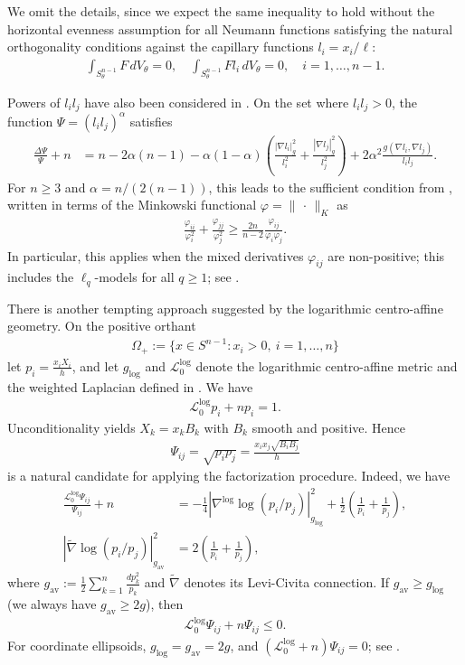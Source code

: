 \documentclass[12pt]{amsart}
\newcommand{\Sn}{S^{n-1}}
\newcommand{\abs}[1]{\left|#1\right|}
\newcommand{\eq}[1]{\begin{equation}\begin{alignedat}{2}#1\end{alignedat}\end{equation}}
\theoremstyle{plain}
\theoremstyle{definition}
\theoremstyle{remark}
\numberwithin{equation}{section}
\begin{document}
We omit the details, since we expect the same inequality to hold without the horizontal evenness assumption for all Neumann functions satisfying the natural orthogonality conditions against the capillary functions $l_i=x_i/\ell$:
\eq{
 \int_{\Sn_{\theta}}F\,dV_{\theta}=0,
 \quad
 \int_{\Sn_{\theta}}Fl_i\,dV_{\theta}=0, \quad i=1,\ldots,n-1.
}

Powers of $l_il_j$ have also been considered in \cite{KLR25}. On the set where $l_il_j>0$, the function $\Psi=(l_il_j)^{\alpha}$ satisfies
\eq{\label{eq:intro-power-supersolution}
\frac{\Delta\Psi}{\Psi}+n
&=n-2\alpha(n-1)-\alpha(1-\alpha)\left(\frac{\abs{\nabla l_i}_g^2}{l_i^2}
+\frac{\abs{\nabla l_j}_g^2}{l_j^2}\right)+2\alpha^2\frac{g(\nabla l_i,\nabla l_j)}{l_il_j}.
}
For $n\ge 3$ and $\alpha=n/(2(n-1))$, this leads to the sufficient condition from \cite[Thm. 1.9]{KLR25}, written in terms of the Minkowski functional $\varphi=\|\,\cdot\,\|_K$ as
\eq{
 \frac{\varphi_{ii}}{\varphi_i^2}+\frac{\varphi_{jj}}{\varphi_j^2}
 \ge \frac{2n}{n-2}\frac{\varphi_{ij}}{\varphi_i\varphi_j}.
}
In particular, this applies when the mixed derivatives $\varphi_{ij}$ are non-positive; this includes the $\ell_q$-models for all $q\geq 1$; see \cite[Cor. 1.6]{KLR25}.

There is another tempting approach suggested by the logarithmic centro-affine geometry. On the positive orthant
\eq{
 \Omega_+:=\{x\in\Sn:x_i>0,\ i=1,\ldots,n\}
}
let $p_i=\frac{x_iX_i}{h}$, and let $g_{\log}$ and $\mathcal{L}_0^{\log}$ denote the logarithmic centro-affine metric and the weighted Laplacian defined in \cite[Sec. 8]{HI26}. We have
\eq{
\mathcal{L}_0^{\log}p_i+np_i=1.
}
Unconditionality yields $X_k=x_kB_k$ with $B_k$ smooth and positive. Hence
\eq{
 \Psi_{ij}=\sqrt{p_ip_j}=\frac{x_ix_j\sqrt{B_iB_j}}{h}
}
is a natural candidate for applying the factorization procedure. Indeed, we have
\eq{
 \frac{\mathcal{L}_0^{\log}\Psi_{ij}}{\Psi_{ij}}+n
 &=-\frac{1}{4}\abs{\nabla^{\log}\log(p_i/p_j)}_{g_{\log}}^2
 +\frac{1}{2}\left(\frac{1}{p_i}+\frac{1}{p_j}\right),\\
 \abs{\tilde{\nabla}\log(p_i/p_j)}_{g_{\mathrm{av}}}^2
 &=2\left(\frac{1}{p_i}+\frac{1}{p_j}\right),
}
where $g_{\mathrm{av}}:=\frac{1}{2}\sum_{k=1}^n\frac{dp_k^2}{p_k}$ and $\tilde{\nabla}$ denotes its Levi-Civita connection. If $g_{\mathrm{av}}\geq g_{\log}$ (we always have $g_{\mathrm{av}}\geq 2g$), then
\eq{
 \mathcal{L}_0^{\log}\Psi_{ij}+n\Psi_{ij}\leq 0.
}
For coordinate ellipsoids, $g_{\log}=g_{\mathrm{av}}=2g$, and $(\mathcal{L}_0^{\log}+n)\Psi_{ij}=0$; see \cite[Prop. 8.2]{HI26}.
\end{document}
